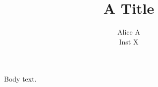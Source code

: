 \documentclass{article}
\begin{document}
\title{A Title}
\author{Alice A\\Inst X}
\makeatletter\g@addto@macro{}\makeatother
\maketitle
Body text.
\end{document}
